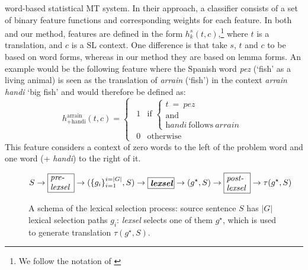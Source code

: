 \documentclass[11pt]{article}
\newcommand{\comment}[1]{\todo{#1}}
\begin{document}
word-based statistical MT system.
In their approach, a classifier consists of a set of binary feature
functions and corresponding weights for each feature.  In both
\cite{berger1996} and our method, features are defined in the form
$h_k^{s}(t, c)$,\footnote{We follow the notation of \cite{berger1996}} where $t$ is a translation, and $c$ is a SL
context. One difference is that \cite{berger1996} take $s$, $t$ and
$c$ to be based on word forms, whereas in our method they are based on
lemma forms.  An example would be the following feature where the
Spanish word \emph{pez} (`fish' as a living animal) is seen as the
translation of \emph{arrain} (`fish') in the context \emph{arrain
  handi} `big fish' and would therefore be defined as:
\begin{equation}
h_\mathrm{+handi}^{\mathrm{arrain}}(t, c) = \left \{ \begin{matrix}
                 ~~1 & \mbox{if } 
\left\{ \begin{array}{c}
t~ =~ \textit{pez}~ \\ \mathrm{and}~ \\ \textit{handi}~ \mathrm{follows}~ \textit{arrain} \end{array} \right. \\
                 ~~0 & \mbox{otherwise} \end{matrix} \right.
\label{eq:feat-func}
\end{equation}
This feature considers a context of zero words to the left of the
problem word and one word (+ \emph{handi}) to the right of it.

\begin{figure*}
\begin{displaymath}
  \label{eq:steps}
  S \to \mbox{\framebox{\parbox{0.9cm}{\textit{pre- lexsel}}}} \to (\{g_i\}_{i=1}^{i=|G|},S) \to \mbox{\framebox{\parbox{0.9cm}{\textit{\textbf{lexsel}}}}} \to (g^\star,S) \to \mbox{\framebox{\parbox{0.9cm}{\textit{post- lexsel}}}} \to \tau(g^\star,S)
\end{displaymath}
 \caption{A schema of the lexical selection process: source sentence \(S\) has \(|G|\) lexical selection paths \(g_i\): \emph{lexsel} selects one of them \(g^\star\), which is used to generate translation \(\tau(g^\star,S)\).}
 \label{fig:lexselschema}
\end{figure*}
\end{document}
